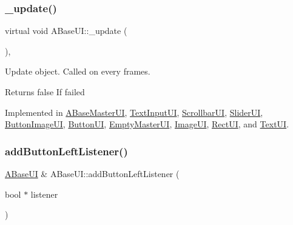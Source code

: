 \subsubsection{\texorpdfstring{\+\_\+update()}{\_update()}}
{\footnotesize\ttfamily virtual void A\+Base\+U\+I\+::\+\_\+update (\begin{DoxyParamCaption}{ }\end{DoxyParamCaption})\hspace{0.3cm}{\ttfamily [protected]}, {}}



Update object. Called on every frames. 

\begin{DoxyReturn}{Returns}
false If failed 
\end{DoxyReturn}


Implemented in \hyperlink{class_a_base_master_u_i_a6c18f89d96c65d68ee1eabd8d4e1ee19}{A\+Base\+Master\+UI}, \hyperlink{class_text_input_u_i_a00ae7b0bc39a734d3f3ecdbc209115d3}{Text\+Input\+UI}, \hyperlink{class_scrollbar_u_i_a75d909bc72204564034629439f6c0489}{Scrollbar\+UI}, \hyperlink{class_slider_u_i_a9655b73fc735ae70844e5fb3c7af24a5}{Slider\+UI}, \hyperlink{class_button_image_u_i_a9f0a37050956baa365de40daf3b05bb5}{Button\+Image\+UI}, \hyperlink{class_button_u_i_a984a9fd2a19550a1a39a7ab905fe1f14}{Button\+UI}, \hyperlink{class_empty_master_u_i_a1bf9ef11a2fa21e5637939ec6c959010}{Empty\+Master\+UI}, \hyperlink{class_image_u_i_aa03456c08f15deecb87b40b55e5b3126}{Image\+UI}, \hyperlink{class_rect_u_i_af35d2c8c63747ef097d0337331f18164}{Rect\+UI}, and \hyperlink{class_text_u_i_a663721b95cff471a1e08dc2030dc802a}{Text\+UI}.

\mbox{\label{class_a_base_u_i_a99d5577cc79031a9711196bf4f583a91}} 
\subsubsection{\texorpdfstring{add\+Button\+Left\+Listener()}{addButtonLeftListener()}}
{\footnotesize\ttfamily \hyperlink{class_a_base_u_i}{A\+Base\+UI} \& A\+Base\+U\+I\+::add\+Button\+Left\+Listener (\begin{DoxyParamCaption}\item[{bool $\ast$}]{listener }\end{DoxyParamCaption})\hspace{0.3cm}{\ttfamily [virtual]}}



